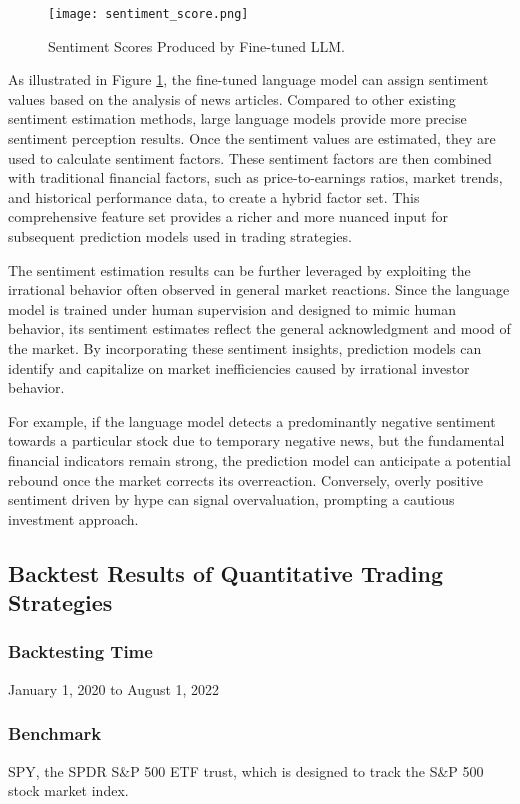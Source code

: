 \documentclass[conference]{IEEEtran}
\begin{document}
\begin{figure}[h]
    \centering
    \texttt{[image: sentiment\_score.png]}
    \caption{Sentiment Scores Produced by Fine-tuned LLM.}
    \label{fig:sentiment scores}
\end{figure}

As illustrated in Figure \ref{fig:sentiment scores}, the fine-tuned language model can assign sentiment values based on the analysis of news articles. Compared to other existing sentiment estimation methods, large language models provide more precise sentiment perception results. Once the sentiment values are estimated, they are used to calculate sentiment factors. These sentiment factors are then combined with traditional financial factors, such as price-to-earnings ratios, market trends, and historical performance data, to create a hybrid factor set. This comprehensive feature set provides a richer and more nuanced input for subsequent prediction models used in trading strategies.

The sentiment estimation results can be further leveraged by exploiting the irrational behavior often observed in general market reactions. Since the language model is trained under human supervision and designed to mimic human behavior, its sentiment estimates reflect the general acknowledgment and mood of the market. By incorporating these sentiment insights, prediction models can identify and capitalize on market inefficiencies caused by irrational investor behavior.

For example, if the language model detects a predominantly negative sentiment towards a particular stock due to temporary negative news, but the fundamental financial indicators remain strong, the prediction model can anticipate a potential rebound once the market corrects its overreaction. Conversely, overly positive sentiment driven by hype can signal overvaluation, prompting a cautious investment approach.

\subsection{\textbf{Backtest Results of Quantitative Trading Strategies}}
\subsubsection*{\textbf{Backtesting Time}}
January 1, 2020 to August 1, 2022

\subsubsection*{\textbf{Benchmark}}
SPY, the SPDR S\&P 500 ETF trust, which is designed to track the S\&P 500 stock market index.
\end{document}
